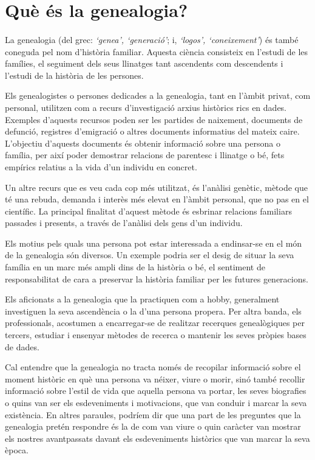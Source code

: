 \section{Què és la genealogia?}

    \paragraph{}
    La \gls{genealogia} (del grec:  \emph{`genea', `generació'}; i, \emph{`logos', `coneixement'}) és també coneguda pel nom d’història familiar. Aquesta ciència consisteix en l’estudi de les famílies, el seguiment dels seus llinatges tant ascendents com descendents i l’estudi de la història de les persones.

    Els genealogistes o persones dedicades a la genealogia, tant en l’àmbit privat, com personal, utilitzen com a recurs d’investigació arxius històrics rics en dades. Exemples d'aquests recursos poden ser les partides de naixement, documents de defunció, registres d’emigració o altres documents informatius del mateix caire. L'objectiu d'aquests documents és obtenir informació sobre una persona o família, per així poder demostrar relacions de parentesc i llinatge o bé, fets empírics relatius a la vida d'un individu en concret.

    Un altre recurs que es veu cada cop més utilitzat, és l'anàlisi genètic, mètode que té una rebuda, demanda i interès més elevat en l’àmbit personal, que no pas en el científic. La principal finalitat d'aquest mètode és esbrinar relacions familiars passades i presents, a través de l'anàlisi dels gens d'un individu.

    Els motius pels quals una persona pot estar interessada a endinsar-se en el món de la genealogia són diversos. Un exemple podria ser el desig de situar la seva família en un marc més ampli dins de la història o bé, el sentiment de responsabilitat de cara a preservar la història familiar per les futures generacions.

    Els aficionats a la genealogia que la practiquen com a hobby, generalment investiguen la seva ascendència o la d’una persona propera. Per altra banda, els pro\-fe\-ssio\-nals, acostumen a encarregar-se de realitzar recerques genealògiques per tercers, estudiar i ensenyar mètodes de recerca o mantenir les seves pròpies bases de dades.

    Cal entendre que la genealogia no tracta només de recopilar informació sobre el moment històric en què una persona va néixer, viure o morir, sinó també recollir informació sobre l'estil de vida que aquella persona va portar, les seves biografies o quins van ser els esdeveniments i motivacions, que van conduir i marcar la seva existència. En altres paraules, podríem dir que una part de les preguntes que la genealogia pretén respondre és la de com van viure o quin caràcter van mostrar els nostres avantpassats davant els esdeveniments històrics que van marcar la seva època.

